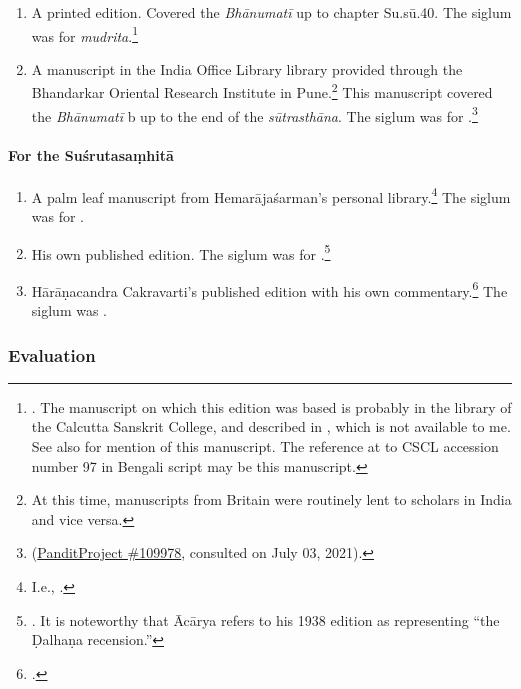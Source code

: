 \begin{enumerate}
    \item A printed edition.  Covered the \emph{Bhānumatī} up to chapter Su.sū.40.
    The siglum was  for \emph{mudrita}.\footnote{\cite{sena-1886}.  
    The
    manuscript on which this edition was based is probably in the library of the
    Calcutta Sanskrit College, and described in \cite[v.\,X.1]{sast-1917}, which
    is not available to me.  See also \cite[IB, 495, n.\,57]{meul-hist} for
    mention of this manuscript.  The reference at \cite[217]{rao-sans} to CSCL
    accession number 97 in Bengali script may be this manuscript.}
    
    \item A manuscript in the India Office Library library provided through the
    Bhandarkar Oriental Research Institute in Pune.\footnote{At this time,
    manuscripts from Britain were routinely lent to scholars in India and vice
    versa.} This manuscript covered the \emph{Bhānumatī} b up to the end of the
    \emph{sūtrasthāna}.  The siglum was  for
    .\footnote{
    (\href{panditproject.org/entity/109978/manuscript}{PanditProject \#109978},
    consulted on July 03, 2021).}
\end{enumerate}

\paragraph{For the Suśrutasaṃhitā}

\begin{enumerate}
    \item A palm leaf manuscript from Hemarājaśarman's personal
    library.\footnote{I.e., .}  The siglum was
     for .
    
    \item His own published edition. The siglum was  for .\footnote{\cite{vulgate}.  It is noteworthy that Ācārya refers to
    his 1938 edition as representing “the Ḍalhaṇa recension.”}
    
    \item Hārāṇacandra Cakravarti's published edition with his own
    commentary.\footcite{bhat-1917} The siglum was .
\end{enumerate}
%
\subsubsection{Evaluation}

